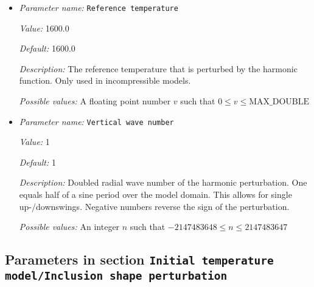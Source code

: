 \begin{itemize}
{\it Default:} 1.0


{\it Description:} The magnitude of the Harmonic perturbation.


{\it Possible values:} A floating point number $v$ such that $0 \leq v \leq \text{MAX\_DOUBLE}$
\item {\it Parameter name:} {\tt Reference temperature}
\label{parameters:Initial temperature model/Harmonic perturbation/Reference temperature}
\label{parameters:Initial_20temperature_20model/Harmonic_20perturbation/Reference_20temperature}


{\it Value:} 1600.0


{\it Default:} 1600.0


{\it Description:} The reference temperature that is perturbed by the harmonic function. Only used in incompressible models.


{\it Possible values:} A floating point number $v$ such that $0 \leq v \leq \text{MAX\_DOUBLE}$
\item {\it Parameter name:} {\tt Vertical wave number}
\label{parameters:Initial temperature model/Harmonic perturbation/Vertical wave number}
\label{parameters:Initial_20temperature_20model/Harmonic_20perturbation/Vertical_20wave_20number}


{\it Value:} 1


{\it Default:} 1


{\it Description:} Doubled radial wave number of the harmonic perturbation.  One equals half of a sine period over the model domain.  This allows for single up-/downswings. Negative numbers  reverse the sign of the perturbation.


{\it Possible values:} An integer $n$ such that $-2147483648\leq n \leq 2147483647$
\end{itemize}

\subsection{Parameters in section \tt Initial temperature model/Inclusion shape perturbation}
\label{parameters:Initial_20temperature_20model/Inclusion_20shape_20perturbation}

